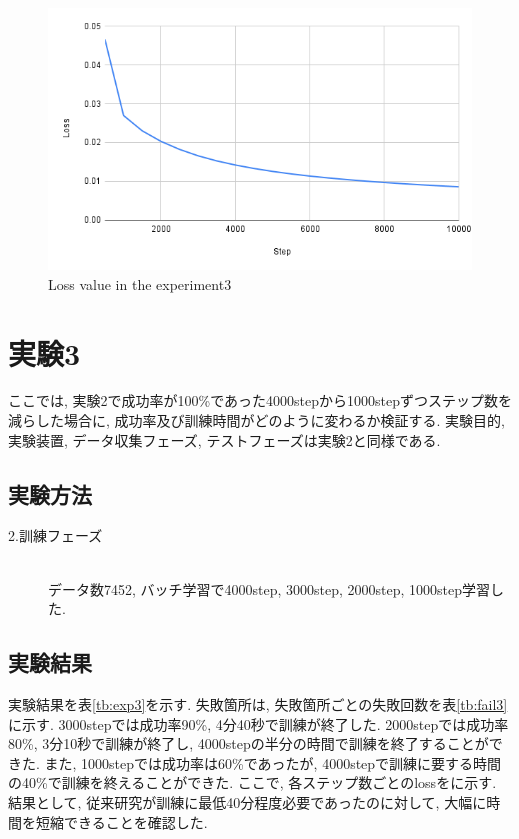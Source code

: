 \begin{figure}[h]
  \centering
  \includegraphics[keepaspectratio, scale=0.31]{images/exp3_10000.png}
  \caption{Loss value in the experiment3}
  \label{Fig:exp2.2-10000}
  \end{figure}

\section{実験3}
ここでは, 実験2で成功率が100\%であった4000stepから1000stepずつステップ数を減らした場合に, 成功率及び訓練時間がどのように変わるか検証する. 実験目的, 実験装置, データ収集フェーズ, テストフェーズは実験2と同様である. 

\subsection{実験方法}
\begin{description}
  \item[2.訓練フェーズ]\mbox{}\\データ数7452, バッチ学習で4000step, 3000step, 2000step, 1000step学習した. 
\end{description}

\subsection{実験結果}
実験結果を表\ref{tb:exp3}を示す. 失敗箇所は, 失敗箇所ごとの失敗回数を表\ref{tb:fail3}に示す. 3000stepでは成功率90\%, 4分40秒で訓練が終了した. 2000stepでは成功率80\%, 3分10秒で訓練が終了し, 4000stepの半分の時間で訓練を終了することができた. また, 1000stepでは成功率は60\%であったが, 4000stepで訓練に要する時間の40\%で訓練を終えることができた. ここで, 各ステップ数ごとのlossをに示す. 結果として, 従来研究が訓練に最低40分程度必要であったのに対して, 大幅に時間を短縮できることを確認した. 

